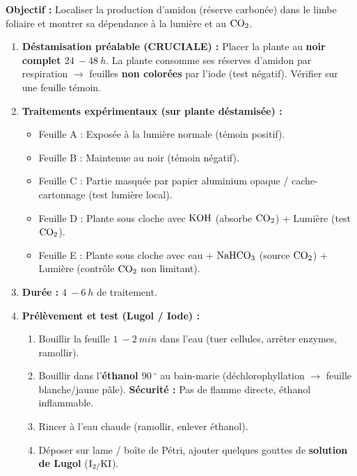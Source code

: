 \documentclass[11pt]{article}
\providecommand{\degree}{^{\circ}}
\begin{document}
\begin{methode}
    \textbf{Objectif :} Localiser la production d'amidon (réserve carbonée) dans le limbe foliaire et montrer sa dépendance à la lumière et au $\ce{CO2}$.
    \begin{enumerate}
        \item \textbf{Déstamisation préalable (CRUCIALE) :} Placer la plante au \textbf{noir complet $\SI{24}{-}\SI{48}{h}$}. La plante consomme ses réserves d'amidon par respiration $\rightarrow$ feuilles \textbf{non colorées} par l'iode (test négatif). Vérifier sur une feuille témoin.
        \item \textbf{Traitements expérimentaux (sur plante déstamisée) :}
            \begin{itemize}
                \item Feuille A : Exposée à la lumière normale (témoin positif).
                \item Feuille B : Maintenue au noir (témoin négatif).
                \item Feuille C : Partie masquée par papier aluminium opaque / cache-cartonnage (test lumière local).
                \item Feuille D : Plante sous cloche avec $\ce{KOH}$ (absorbe $\ce{CO2}$) + Lumière (test $\ce{CO2}$).
                \item Feuille E : Plante sous cloche avec eau + $\ce{NaHCO3}$ (source $\ce{CO2}$) + Lumière (contrôle $\ce{CO2}$ non limitant).
            \end{itemize}
        \item \textbf{Durée :} $\SI{4}{-}\SI{6}{h}$ de traitement.
        \item \textbf{Prélèvement et test (Lugol / Iode) :}
            \begin{enumerate}
                \item Bouillir la feuille $\SI{1}{-}\SI{2}{min}$ dans l'eau (tuer cellules, arrêter enzymes, ramollir).
                \item Bouillir dans l'\textbf{éthanol $\SI{90}{\degree}$} au bain-marie (déchlorophyllation $\rightarrow$ feuille blanche/jaune pâle). \textbf{Sécurité :} Pas de flamme directe, éthanol inflammable.
                \item Rincer à l'eau chaude (ramollir, enlever éthanol).
                \item Déposer sur lame / boîte de Pétri, ajouter quelques gouttes de \textbf{solution de Lugol} ($\ce{I2/KI}$).

\end{enumerate}
\end{enumerate}
\end{methode}
\end{document}
